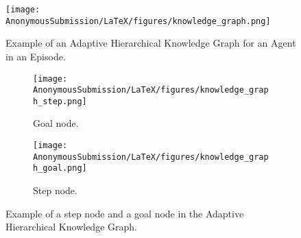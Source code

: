 \begin{figure}[h]
    \centering
    \texttt{[image: AnonymousSubmission/LaTeX/figures/knowledge\_graph.png]}
    \caption{Example of an Adaptive Hierarchical Knowledge Graph for an Agent in an Episode.}
    \label{fig:knowledge_graph}
\end{figure}

\begin{figure}[h]
    \centering
    \begin{subfigure}[b]{0.4\textwidth}
        \centering
        \texttt{[image: AnonymousSubmission/LaTeX/figures/knowledge\_graph\_step.png]}
        \caption{Goal node.}
    \end{subfigure}
    \hfill %
    \begin{subfigure}[b]{0.4\textwidth}
        \centering
        \texttt{[image: AnonymousSubmission/LaTeX/figures/knowledge\_graph\_goal.png]}
        \caption{Step node.}
    \end{subfigure}
    \caption{Example of a step node and a goal node in the Adaptive Hierarchical Knowledge Graph.}
    \label{fig:knowledge_graph_node}
\end{figure}




\newpage
